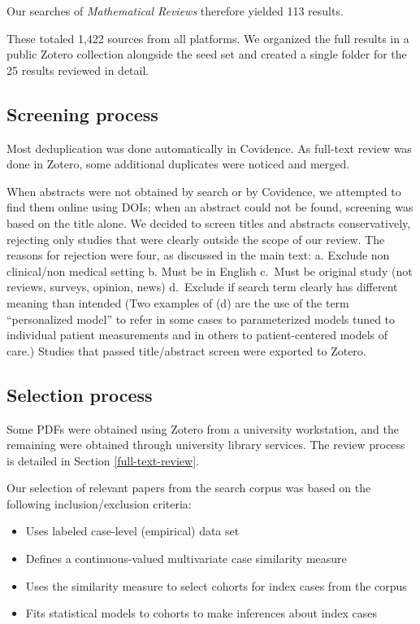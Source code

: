 \documentclass{article}
\providecommand{\tightlist}{%
  \setlength{\itemsep}{0pt}\setlength{\parskip}{0pt}}
\begin{document}
Our searches of \emph{Mathematical Reviews} therefore yielded 113
results.

These totaled 1,422 sources from all platforms. We organized the full
results in a public Zotero collection alongside the seed set and created
a single folder for the 25 results reviewed in detail.

\hypertarget{screening-process}{%
\subsection*{Screening process}\label{screening-process}}

Most deduplication was done automatically in Covidence. As full-text
review was done in Zotero, some additional duplicates were noticed and
merged.

When abstracts were not obtained by search or by Covidence, we attempted
to find them online using DOIs; when an abstract could not be found,
screening was based on the title alone. We decided to screen titles and
abstracts conservatively, rejecting only studies that were clearly
outside the scope of our review. The reasons for rejection were four, as
discussed in the main text: a. Exclude non clinical/non medical setting
b. Must be in English c.~Must be original study (not reviews, surveys,
opinion, news) d.~Exclude if search term clearly has different meaning
than intended (Two examples of (d) are the use of the term
``personalized model'' to refer in some cases to parameterized models
tuned to individual patient measurements and in others to
patient-centered models of care.) Studies that passed title/abstract
screen were exported to Zotero.

\hypertarget{selection-process}{%
\subsection*{Selection process}\label{selection-process}}

Some PDFs were obtained using Zotero from a university workstation, and
the remaining were obtained through university library services. The
review process is detailed in Section \ref{full-text-review}.

Our selection of relevant papers from the search corpus was based on the
following inclusion/exclusion criteria:

\begin{itemize}
\tightlist
\item
  Uses labeled case-level (empirical) data set
\item
  Defines a continuous-valued multivariate case similarity measure
\item
  Uses the similarity measure to select cohorts for index cases from the
  corpus
\item
  Fits statistical models to cohorts to make inferences about index
  cases
\end{itemize}
\end{document}
